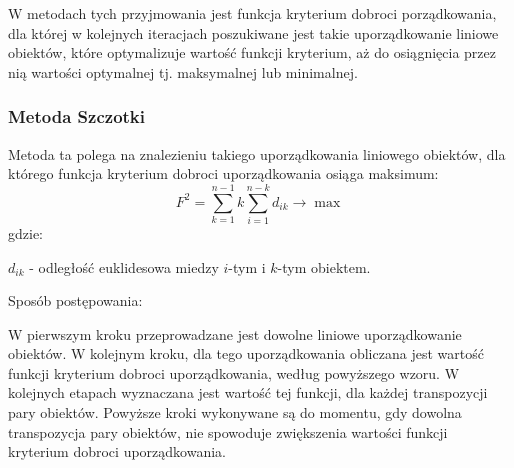 \documentclass[12pt,a4paper]{report}
\begin{document}
W metodach tych przyjmowania jest funkcja kryterium dobroci porządkowania, dla której w kolejnych iteracjach poszukiwane jest takie uporządkowanie liniowe obiektów, które optymalizuje wartość funkcji kryterium, aż do osiągnięcia przez nią wartości optymalnej tj. maksymalnej lub minimalnej. 


\subsubsection{Metoda Szczotki}


Metoda ta polega na znalezieniu takiego uporządkowania liniowego obiektów, dla którego funkcja kryterium dobroci uporządkowania osiąga maksimum:
$$
F^{2}=\sum_{k=1}^{n-1} k\sum_{i=1}^{n-k} d_{ik} \rightarrow     \max  
$$
gdzie:

$d_{ik}$ - odległość euklidesowa miedzy $i$-tym i $k$-tym obiektem.

Sposób postępowania:

W pierwszym kroku przeprowadzane jest dowolne liniowe uporządkowanie obiektów. W kolejnym kroku, dla tego uporządkowania obliczana jest wartość funkcji kryterium dobroci uporządkowania, według powyższego wzoru. W kolejnych etapach wyznaczana jest wartość tej funkcji, dla każdej transpozycji pary obiektów. Powyższe kroki wykonywane są do momentu, gdy dowolna transpozycja pary obiektów, nie spowoduje zwiększenia wartości funkcji kryterium dobroci uporządkowania. 
\end{document}
